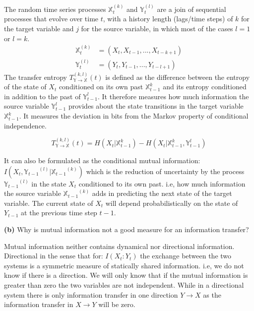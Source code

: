 \documentclass[11pt]{article}
\begin{document}
The random time series processes $\mathbb {X}^{(k)}_{t}$ and $\mathbb {Y}^{(l)}_{t}$ are a join of sequential processes that evolve over time $t$, with a history length (lags/time steps) of $k$ for the target variable and $j$ for the source variable, in which most of the cases $l=1$ or $l=k$.
\begin{equation*}
\begin{split}
\mathbb {X}^{(k)}_{t} &= (X_{t}, X_{t-1},...,X_{t-k+1})\\
\mathbb {Y}^{(l)}_{t} &= (Y_{t}, Y_{t-1},...,Y_{t-l+1})
\end{split}
\end{equation*}
The transfer entropy ${T}^{(k,l)}_{\mathbb{Y}\rightarrow \mathbb{X}}(t)$ is defined as the difference between the entropy of the state of $X_{t}$ conditioned on its own past ${\mathbb{X}}^{k}_{t-1}$ and its entropy conditioned in addition to the past of ${\mathbb{Y}}^{l}_{t-1}$. It therefore measures how much information the source variable ${\mathbb{Y}}^{l}_{t-1}$ provides about the state transitions in the target variable ${\mathbb{X}}^{k}_{t-1}$. It measures the deviation in bits from the Markov property of conditional independence. 

\begin{equation*}
{T}^{(k,l)}_{\mathbb{Y}\rightarrow \mathbb{X}}(t) = H(X_{t}|{\mathbb{X}}^{k}_{t-1}) - H(X_{t}|{\mathbb{X}}^{k}_{t-1},{\mathbb{Y}}^{l}_{t-1})
\end{equation*}


It can also be formulated as the conditional mutual information: \\
$I(X_{t}, {\mathbb{Y}_{t-1}}^{(l)}|{\mathbb{X}_{t-1}}^{(k)})$ which is the reduction of uncertainty by the process ${\mathbb{Y}_{t-1}}^{(l)}$ in the state $X_{t}$ conditioned to its own past. i.e, how much information the source variable ${\mathbb{X}_{t-1}}^{(k)}$ adds in predicting the next state of the target variable. The current state of $X_{t}$ will depend probabilistically on the state of $Y_{t-1}$ at the previous time step $t-1$.  \\

\begin{tcolorbox}
\textbf{(b)}
Why is mutual information not a good measure for an information transfer?
\end{tcolorbox}

Mutual information neither contains dynamical nor directional information. Directional in the sense that for: $I(X_{t}:Y_{t})$ the exchange between the two systems is a symmetric measure of statically shared information. i.e, we do not know if there is a direction. We will only know that if the mutual information is greater than zero the two variables are not independent. While in a directional system there is only information transfer in one direction $Y \rightarrow X$ as the information transfer in $X \rightarrow Y$ will be zero. \\ 
\end{document}
